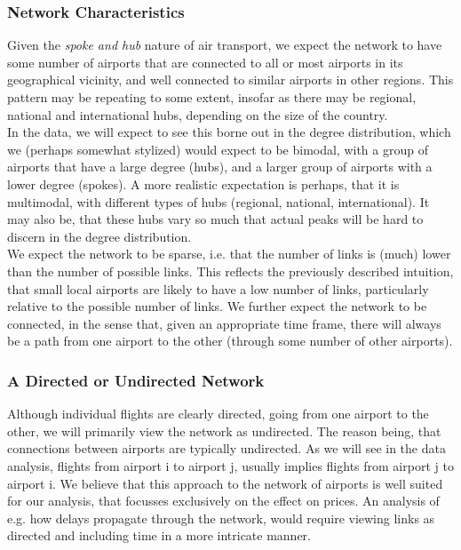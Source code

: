 \subsubsection{Network Characteristics}
Given the \textit{spoke and hub} nature of air transport, we expect the network to have some number of airports that are connected to all or most airports in its geographical vicinity, and well connected to similar airports in other regions. This pattern may be repeating to some extent, insofar as there may be regional, national and international hubs, depending on the size of the country. \\ \medskip
In the data, we will expect to see this borne out in the degree distribution, which we (perhaps somewhat stylized) would expect to be bimodal, with a group of airports that have a large degree (hubs), and a larger group of airports with a lower degree (spokes). A more realistic expectation is perhaps, that it is multimodal, with different types of hubs (regional, national, international). It may also be, that these hubs vary so much that actual peaks will be hard to discern in the degree distribution. \\
\medskip
We expect the network to be sparse, i.e. that the number of links is (much) lower than the number of possible links. This reflects the previously described intuition, that small local airports are likely to have a low number of links, particularly relative to the possible number of links. We further expect the network to be connected, in the sense that, given an appropriate time frame, there will always be a path from one airport to the other (through some number of other airports).

\subsubsection{A Directed or Undirected Network}
Although individual flights are clearly directed, going from one airport to the other, we will primarily view the network as undirected. The reason being, that connections between airports are typically undirected.
As we will see in the data analysis, flights from airport i to airport j, usually implies flights from airport j to airport i. We believe that this approach to the network of airports is well suited for our analysis, that focusses exclusively on the effect on prices. An analysis of e.g. how delays propagate through the network, would require viewing links as directed and including time in a more intricate manner.\\

